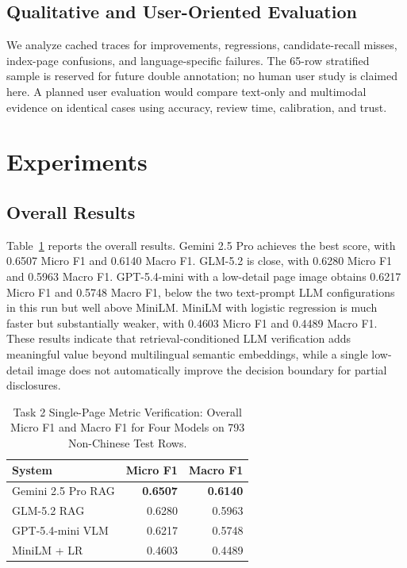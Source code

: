 \documentclass[sigconf,article]{acmart}
\begin{document}
\subsection{Qualitative and User-Oriented Evaluation}
We analyze cached traces for improvements, regressions, candidate-recall misses, index-page confusions, and language-specific failures. The 65-row stratified sample is reserved for future double annotation; no human user study is claimed here. A planned user evaluation would compare text-only and multimodal evidence on identical cases using accuracy, review time, calibration, and trust.

\section{Experiments}
\subsection{Overall Results}
Table~\ref{tab:overall} reports the overall results. Gemini 2.5 Pro achieves the best score, with 0.6507 Micro F1 and 0.6140 Macro F1. GLM-5.2 is close, with 0.6280 Micro F1 and 0.5963 Macro F1. GPT-5.4-mini with a low-detail page image obtains 0.6217 Micro F1 and 0.5748 Macro F1, below the two text-prompt LLM configurations in this run but well above MiniLM. MiniLM with logistic regression is much faster but substantially weaker, with 0.4603 Micro F1 and 0.4489 Macro F1. These results indicate that retrieval-conditioned LLM verification adds meaningful value beyond multilingual semantic embeddings, while a single low-detail image does not automatically improve the decision boundary for partial disclosures.

\begin{table}[t]
\caption{Task 2 Single-Page Metric Verification: Overall Micro F1 and Macro F1 for Four Models on 793 Non-Chinese Test Rows.}
\label{tab:overall}
\centering
\begin{tabular}{lrr}
\toprule
System & Micro F1 & Macro F1 \\
\midrule
Gemini 2.5 Pro RAG & \textbf{0.6507} & \textbf{0.6140} \\
GLM-5.2 RAG & 0.6280 & 0.5963 \\
GPT-5.4-mini VLM & 0.6217 & 0.5748 \\
MiniLM + LR & 0.4603 & 0.4489 \\
\bottomrule
\end{tabular}
\end{table}
\end{document}
